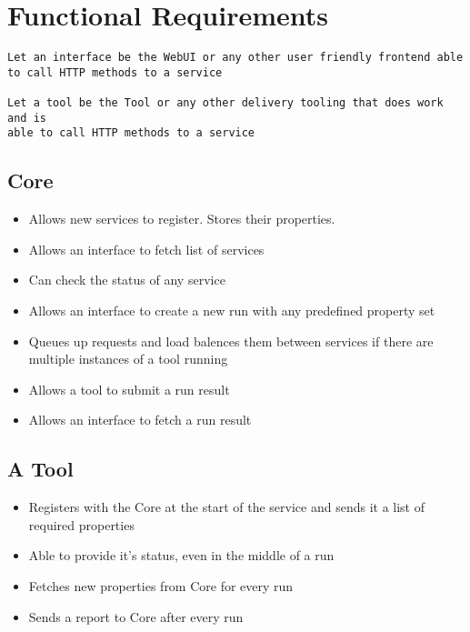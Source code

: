 \documentclass[12pt]{article}
\begin{document}
\newpage

\section{Functional Requirements}\label{functional-requirements}

\begin{verbatim}
Let an interface be the WebUI or any other user friendly frontend able 
to call HTTP methods to a service

Let a tool be the Tool or any other delivery tooling that does work and is 
able to call HTTP methods to a service
\end{verbatim}

\subsection{Core}\label{core}

\begin{itemize}
\item
  Allows new services to register. Stores their properties.
\item
  Allows an interface to fetch list of services
\item
  Can check the status of any service
\item
  Allows an interface to create a new run with any predefined property
  set
\item
  Queues up requests and load balences them between services if there
  are multiple instances of a tool running
\item
  Allows a tool to submit a run result
\item
  Allows an interface to fetch a run result
\end{itemize}

\subsection{A Tool}\label{a-tool}

\begin{itemize}
\item
  Registers with the Core at the start of the service and sends it a
  list of required properties
\item
  Able to provide it's status, even in the middle of a run
\item
  Fetches new properties from Core for every run
\item
  Sends a report to Core after every run
\end{itemize}
\end{document}
